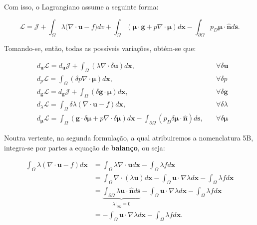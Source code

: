 Com isso, o Lagrangiano assume a seguinte forma:

\begin{equation}
	\boldsymbol{\mathcal{L}} = \boldsymbol{\mathcal{J}} + \int_{\Omega} \lambda \big(\nabla \cdot \mathbf{u} - f\big)dv +\int_{\Omega}(\boldsymbol{\mu} \cdot \textbf{g} + p\nabla \cdot \boldsymbol{\mu})d\mathbf{x} - \int_{\partial \Omega} p_{D} \boldsymbol{\mu} \cdot  \mathbf{\hat{n}}d\mathbf{s}.
\end{equation}

Tomando-se, então, todas as possíveis variações, obtém-se que:

\begin{equation}
	\begin{aligned}
		&d_{\mathbf{u}}\boldsymbol{\mathcal{L}} = d_{\mathbf{u}}\boldsymbol{\mathcal{J}} + \int_{\Omega}(\lambda\nabla \cdot \delta \mathbf{u})d\mathbf{x}, &\quad \forall \delta \mathbf{u} \\
		&d_{p}\boldsymbol{\mathcal{L}} = \int_{\Omega}(\delta p \nabla \cdot \boldsymbol{\mu}) d\mathbf{x}, &\quad \forall \delta p \\
		&d_{\mathbf{g}}\boldsymbol{\mathcal{L}} = d_{\mathbf{g}}\boldsymbol{\mathcal{J}}  + \int_{\Omega} (\delta\mathbf{g} \cdot \boldsymbol{\mu})d\mathbf{x}, &\quad \forall \delta \mathbf{g} \\
		&d_{\lambda}\boldsymbol{\mathcal{L}} = \int_{\Omega} \delta \lambda (\nabla \cdot \mathbf{u} - f)d\mathbf{x}, &\quad \forall \delta \lambda \\
		&d_{\boldsymbol{\mu}}\boldsymbol{\mathcal{L}} = \int_{\Omega}(\mathbf{g} \cdot \delta \boldsymbol{\mu} + p \nabla \cdot \delta \boldsymbol{\mu})d\mathbf{x} - \int_{\partial \Omega} (p_{D} \delta \boldsymbol{\mu} \cdot  \mathbf{\hat{n}}) d\mathbf{s}, &\quad \forall \delta \boldsymbol{\mu}
	\end{aligned}
\end{equation}

Noutra vertente, na segunda formulação, a qual atribuiremos a nomenclatura 5B, integra-se por partes a equação de \textbf{balanço}, ou seja:

\begin{equation}
	\begin{aligned}
		\int_{\Omega}\lambda (\nabla \cdot \mathbf{u} - f)d\mathbf{x} & = \int_{\Omega}\lambda \nabla \cdot \mathbf{u} d\mathbf{x} - \int_{\Omega} \lambda f d\mathbf{x} \\		
		& = \int_{\Omega} \nabla \cdot (\lambda \mathbf{u}) d\mathbf{x} - \int_{\Omega} \mathbf{u} \cdot \nabla \lambda d\mathbf{x} - \int_{\Omega} \lambda f d\mathbf{x} \\
		& = \underbrace{\int_{\partial \Omega} \lambda \mathbf{u} \cdot \mathbf{\hat{n}} d\mathbf{s}}_{\lambda|_{\partial \Omega} = 0 } - \int_{\Omega} \mathbf{u} \cdot \nabla \lambda d\mathbf{x} - \int_{\Omega} \lambda f d\mathbf{x} \\
		& = - \int_{\Omega} \mathbf{u} \cdot \nabla \lambda d\mathbf{x} - \int_{\Omega} \lambda f d\mathbf{x}.
	\end{aligned}
\end{equation}


